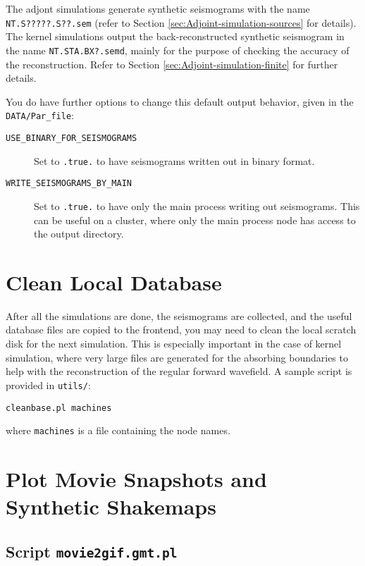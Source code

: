 The adjont simulations generate synthetic seismograms with the name
\texttt{NT.S?????.S??.sem} (refer to Section \ref{sec:Adjoint-simulation-sources}
for details). The kernel simulations output the back-reconstructed
synthetic seismogram in the name \texttt{NT.STA.BX?.semd}, mainly
for the purpose of checking the accuracy of the reconstruction. Refer
to Section \ref{sec:Adjoint-simulation-finite} for further details.\newline

You do have further options to change this default output behavior,
given in the \texttt{DATA/Par\_file}:
\begin{description}
\item [{\texttt{USE\_BINARY\_FOR\_SEISMOGRAMS}}] Set to \texttt{.true.} to have seismograms
written out in binary format.
\item [{\texttt{WRITE\_SEISMOGRAMS\_BY\_MAIN}}] Set to \texttt{.true.}
to have only the main process writing out seismograms. This can
be useful on a cluster, where only the main process node has access
to the output directory.
\end{description}


\section{Clean Local Database}

After all the simulations are done, the seismograms are collected,
and the useful database files are copied to the frontend, you may
need to clean the local scratch disk for the next simulation. This
is especially important in the case of kernel simulation, where very
large files are generated for the absorbing boundaries to help with
the reconstruction of the regular forward wavefield. A sample script
is provided in \texttt{utils/}:
\begin{verbatim}
cleanbase.pl machines
\end{verbatim}
where \texttt{machines} is a file containing the node names.


\section{Plot Movie Snapshots and Synthetic Shakemaps}


\subsection{Script \texttt{movie2gif.gmt.pl}}

